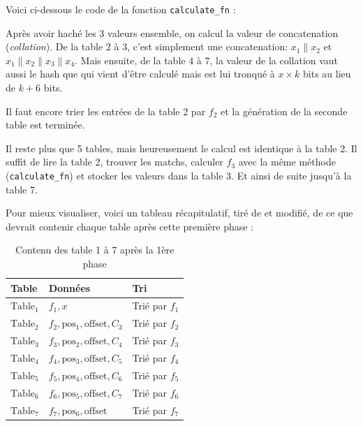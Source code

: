 Voici ci-dessous le code de la fonction \verb|calculate_fn| :


Après avoir haché les 3 valeurs ensemble, on calcul la valeur de concatenation (\emph{collation}). De la table 2 à 3, c'est simplement une concatenation: $x_1\|x_2$ et $x_1\|x_2\|x_3\|x_4$. Mais ensuite, de la table 4 à 7, la valeur de la collation vaut aussi le hash que qui vient d'être calculé mais est lui tronqué à $x \times k$ bits au lieu de $k + 6$ bits.

Il faut encore trier les entrées de la table 2 par $f_2$ et la génération de la seconde table est terminée.


Il reste plus que 5 tables, mais heureusement le calcul est identique à la table 2. Il suffit de lire la table 2, trouver les matchs, calculer $f_3$ avec la même méthode (\verb|calculate_fn|) et stocker les valeurs dans la table 3. Et ainsi de suite jusqu'à la table 7.

Pour mieux visualiser, voici un tableau récapitulatif, tiré de \cite{chia:construction} et modifié, de ce que devrait contenir chaque table après cette première phase :

\begin{table}[H]
  \centering
  \begin{tabular}{l l l}
    \textbf{Table} & \textbf{Données} & \textbf{Tri} \\
    \hline
    \hline
    $\mathrm{Table_1}$ & $f_1,x$ & Trié par $f_1$ \\
    \hline
    $\mathrm{Table_2}$ & $f_2,\mathrm{pos_1},\mathrm{offset},C_3$ & Trié par $f_2$ \\
    \hline
    $\mathrm{Table_3}$ & $f_3,\mathrm{pos_2},\mathrm{offset},C_4$ & Trié par $f_3$ \\
    \hline
    $\mathrm{Table_4}$ & $f_4,\mathrm{pos_3},\mathrm{offset},C_5$ & Trié par $f_4$ \\
    \hline
    $\mathrm{Table_5}$ & $f_5,\mathrm{pos_4},\mathrm{offset},C_6$ & Trié par $f_5$ \\
    \hline
    $\mathrm{Table_6}$ & $f_6,\mathrm{pos_5},\mathrm{offset},C_7$ & Trié par $f_6$ \\
    \hline
    $\mathrm{Table_7}$ & $f_7,\mathrm{pos_6},\mathrm{offset}$ & Trié par $f_7$ \\
    \hline
  \end{tabular}
  \caption{Contenu des table 1 à 7 après la 1ère phase}
\end{table}

